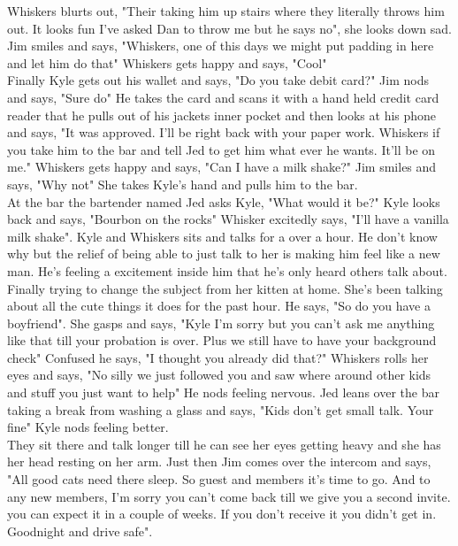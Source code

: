 \documentclass {article}[12pt]
\begin{document}
Whiskers blurts out, "Their taking him up stairs where they literally throws him out. It looks fun I've asked Dan to throw me but he says no", she looks down sad. Jim smiles and says, "Whiskers, one of this days we might put padding in here and let him do that" Whiskers gets happy and says, "Cool"\\

Finally Kyle gets out his wallet and says, "Do you take debit card?" Jim nods and says, "Sure do" He takes the card and scans it with a hand held credit card reader that he pulls out of his jackets inner pocket and then looks at his phone and says, "It was approved. I'll be right back with your paper work. Whiskers if you take him to the bar and tell Jed to get him what ever he wants. It'll be on me." Whiskers gets happy and says, "Can I have a milk shake?" Jim smiles and says, "Why not"  She takes Kyle's hand and pulls him to the bar.\\

At the bar the bartender named Jed asks Kyle, "What would it be?" Kyle looks back and says, "Bourbon on the rocks" Whisker excitedly says, "I'll have a vanilla milk shake". Kyle and Whiskers sits and talks for a over a hour. He don't know why but the relief of being able to just talk to her is making him feel like a new man. He's feeling a excitement inside him that he's only heard others talk about. Finally trying to change the subject from her kitten at home. She's been talking about all the cute things it does for the past hour. He says, "So do you have a boyfriend". She gasps and says, "Kyle I'm sorry but you can't ask me anything like that till your probation is over. Plus we still have to have your background check" Confused he says, "I thought you already did that?" Whiskers rolls her eyes and says, "No silly we just followed you and saw where around other kids and stuff you just want to help" He nods feeling nervous. Jed leans over the bar taking a break from washing a glass and says, "Kids don't get small talk. Your fine" Kyle nods feeling better.\\

They sit there and talk longer till he can see her eyes getting heavy and she has her head resting on her arm. Just then Jim comes over the intercom and says, "All good cats need there sleep. So guest and members it's time to go. And to any new members, I'm sorry you can't come back till we give you a second invite. you can expect it in a couple of weeks. If  you don't receive it you didn't get in. Goodnight and drive safe". \\
\end{document}
